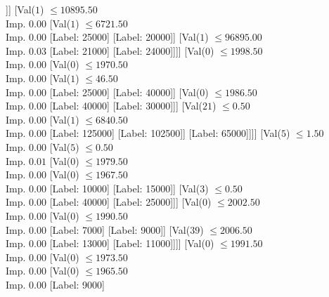 \documentclass[margin=10pt]{standalone}
\begin{document}
\begin{forest}[Val($7$) $ \leq 0.50$ \\ Imp. $0.00$
	[Val($11$) $ \leq 0.50$ \\ Imp. $0.00$
		[Val($1$) $ \leq 5436.50$ \\ Imp. $0.00$
			[Val($1$) $ \leq 90.50$ \\ Imp. $0.00$
				[Label: 26000]
				[Val($1$) $ \leq 3523.50$ \\ Imp. $0.00$
					[Label: 35000]
					[Label: 26000]]]
			[Val($1$) $ \leq 10895.50$ \\ Imp. $0.00$
				[Val($1$) $ \leq 6721.50$ \\ Imp. $0.00$
					[Label: 25000]
					[Label: 20000]]
				[Val($1$) $ \leq 96895.00$ \\ Imp. $0.03$
					[Label: 21000]
					[Label: 24000]]]]
		[Val($0$) $ \leq 1998.50$ \\ Imp. $0.00$
			[Val($0$) $ \leq 1970.50$ \\ Imp. $0.00$
				[Val($1$) $ \leq 46.50$ \\ Imp. $0.00$
					[Label: 25000]
					[Label: 40000]]
				[Val($0$) $ \leq 1986.50$ \\ Imp. $0.00$
					[Label: 40000]
					[Label: 30000]]]
			[Val($21$) $ \leq 0.50$ \\ Imp. $0.00$
				[Val($1$) $ \leq 6840.50$ \\ Imp. $0.00$
					[Label: 125000]
					[Label: 102500]]
				[Label: 65000]]]]
	[Val($5$) $ \leq 1.50$ \\ Imp. $0.00$
		[Val($5$) $ \leq 0.50$ \\ Imp. $0.01$
			[Val($0$) $ \leq 1979.50$ \\ Imp. $0.00$
				[Val($0$) $ \leq 1967.50$ \\ Imp. $0.00$
					[Label: 10000]
					[Label: 15000]]
				[Val($3$) $ \leq 0.50$ \\ Imp. $0.00$
					[Label: 40000]
					[Label: 25000]]]
			[Val($0$) $ \leq 2002.50$ \\ Imp. $0.00$
				[Val($0$) $ \leq 1990.50$ \\ Imp. $0.00$
					[Label: 7000]
					[Label: 9000]]
				[Val($39$) $ \leq 2006.50$ \\ Imp. $0.00$
					[Label: 13000]
					[Label: 11000]]]]
		[Val($0$) $ \leq 1991.50$ \\ Imp. $0.00$
			[Val($0$) $ \leq 1973.50$ \\ Imp. $0.00$
				[Val($0$) $ \leq 1965.50$ \\ Imp. $0.00$
					[Label: 9000]

\end{forest}
\end{document}
